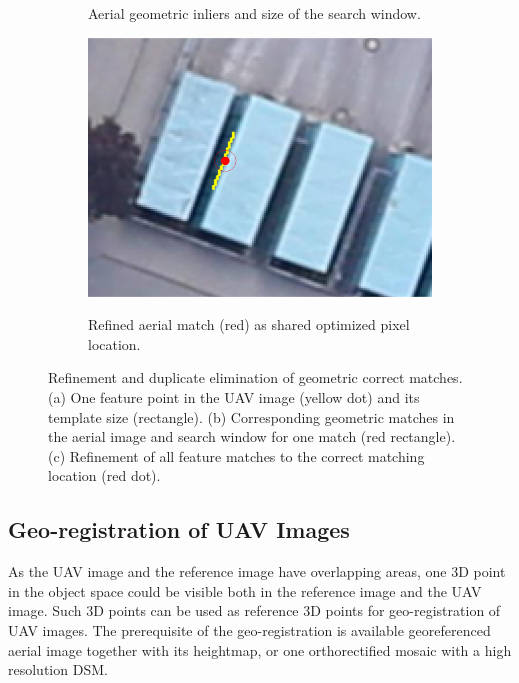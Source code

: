 \begin{figure}[tbp]
\begin{subfigure}[tbp]{0.35\columnwidth}
           \caption[]{Aerial geometric inliers and size of the search window.}%
           {{\small }}    
           \label{fig:refine_b}
       \end{subfigure}
       \hfill
       \begin{subfigure}[tbp]{0.35\columnwidth}  
           \centering 
           \includegraphics[width=\textwidth]{figures_4/refine_air_correct.png}
           \caption[]{Refined aerial match (red) as shared optimized pixel location.}%
           {{\small }}   
           \label{fig:refine_c}
       \end{subfigure}
       \caption{Refinement and duplicate elimination of geometric correct matches. (a) One feature point in the UAV image (yellow dot) and its template size (rectangle). (b) Corresponding geometric matches in the aerial image and search window for one match (red rectangle). (c) Refinement of all  feature matches to the correct matching location (red dot).}
       \label{fig:refine}
\end{figure}

\subsection{Geo-registration of UAV Images}
\label{ssec:registration}
As the UAV image and the reference image have overlapping areas, one 3D point in the object space could be visible both in the reference image and the UAV image. Such 3D points can be used as reference 3D points for geo-registration of UAV images. The prerequisite of the geo-registration is available georeferenced aerial image together with its heightmap, or one orthorectified mosaic with a high resolution DSM. 


